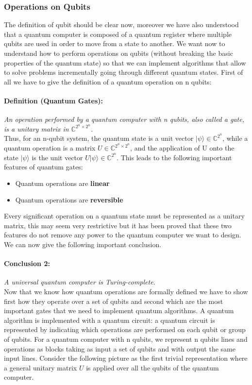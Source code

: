 \documentclass[english]{article}
\begin{document}
			\subsubsection{Operations on Qubits}
			\label{sec:operationsOnQubits}
				The definition of qubit should be clear now, moreover we have also understood that a quantum computer is composed of a quantum register where multiple qubits are used in order to move from a state to another. We want now to understand how to perform operations on qubits (without breaking the basic properties of the quantum state) so that we can implement algorithms that allow to solve problems incrementally going through different quantum states. First of all we have to give the definition of a quantum operation on n qubits:
				
				\paragraph{Definition (Quantum Gates):} \emph{An operation performed by a quantum computer with n qubits, also called a gate, is a unitary matrix in $\mathbb{C}^{2^{n}\times2^{n}}$.} \\
				
				Thus, for an n-qubit system, the quantum state is a unit vector $|\psi\rangle\in\mathbb{C}^{2^{n}}$, while a quantum operation is a matrix $U\in\mathbb{C}^{2^{n}\times2^{n}}$, and the application of U onto the state $|\psi\rangle$ is the unit vector $U|\psi\rangle\in\mathbb{C}^{2^{n}}$. This leads to the following important features of quantum gates:
				\begin{itemize}
					\item Quantum operations are \textbf{linear}
					\item Quantum operations are \textbf{reversible}
				\end{itemize}
				Every significant operation on a quantum state must be represented as a unitary matrix, this may seem very restrictive but it has been proved that these two features do not remove any power to the quantum computer we want to design. We can now give the following important conclusion.
				
				\paragraph{Conclusion 2:} \label{conc:qcTuring}\emph{A universal quantum computer is Turing-complete.}\\
				
				Now that we know how quantum operations are formally defined we have to show first how they operate over a set of qubits and second which are the most important gates that we need to implement quantum algorithms. A quantum algorithm is implemented with a quantum circuit: a quantum circuit is represented by indicating which operations are performed on each qubit or group of qubits. For a quantum computer with n qubits, we represent n qubits lines and operations as blocks taking as input a set of qubits and with output the same input lines. Consider the following picture as the first trivial representation where a general unitary matrix $U$ is applied over all the qubits of the quantum computer. 
				
\end{document}
